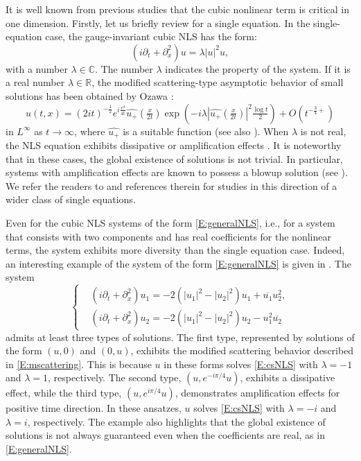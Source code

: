\documentclass[11pt,a4paper,oneside]{amsart}
\theoremstyle{plain}
\theoremstyle{remark}
\numberwithin{equation}{section}
\def\({\left(}
\def\){\right)}
\theoremstyle{definition}
\begin{document}
It is well known from previous studies that the cubic nonlinear term is critical in one dimension. Firstly, let us briefly review for a single equation. 
In the single-equation case,
the gauge-invariant cubic NLS has the form:
\begin{equation}\label{E:csNLS}
	(i  \partial_t + \partial_x^2 )u = \lambda |u|^2 u,
\end{equation}
with a number $\lambda \in \mathbb{C}$.
The number $\lambda$ indicates the property of the system.
If it is a real number $\lambda \in \mathbb{R}$, the modified scattering-type asymptotic behavior of small solutions has been obtained by Ozawa \cite{Oz}:
\begin{equation}\label{E:mscattering}
	u(t,x) = (2it)^{-\frac12} e^{i\frac{x^2}{4t}} \widehat{u_+}(\tfrac{x}{2t}) \exp \( -i \lambda |\widehat{u_+}(\tfrac{x}{2t})|^2 \tfrac{\log t}{2}  \) + O(t^{-\frac34+})
\end{equation}
in $L^\infty$  as $t\to\infty$,
where $\widehat{u_+}$ is a suitable function (see also \cite{GO,HN,KP,IT,MM,MMU,Mu}).
When $\lambda$ is not real, the NLS equation exhibits dissipative or amplification effects \cite{Shimomura,Kita}. It is noteworthy that in these cases, the global existence of solutions  is not trivial. In particular, systems with amplification effects are known to possess a blowup solution (see \cite{Kita}).
We refer the readers to \cite{MM2,MurPus} and references therein for studies in this direction of a wider class of single equations.

Even for the cubic NLS systems
of the form \eqref{E:generalNLS}, i.e., for a system that consists with two components and has real coefficients for the nonlinear terms, the system exhibits more diversity than the single equation case. Indeed, an interesting example of the system of the form \eqref{E:generalNLS} is given in
 \cite[Appendix B]{MSU2}.
The system
\begin{equation}
	\left\{
	\begin{aligned}
	& (i  \partial_t + \partial_x^2 )u_1 = -2(|u_1|^2- |u_2|^2) u_1 + \overline{u_1}u_2^2,  \\
	& (i  \partial_t + \partial_x^2 )u_2 = -2(|u_1|^2- |u_2|^2) u_2 - u_1^2\overline{u_2} 
	\end{aligned}
	\right.
\end{equation}
admits at least three types of solutions. The first type, represented by solutions of the form $(u,0)$ and $(0,u)$, exhibits the modified scattering behavior described in \eqref{E:mscattering}.
This is because $u$ in these forms solves \eqref{E:csNLS} with $\lambda=-1$ and $\lambda=1$, respectively.
The second type, $(u,e^{-i\pi/4} u)$, exhibits a dissipative effect, while the third type, $(u,e^{i\pi/4} u)$, demonstrates amplification effects for positive time direction.
In these ansatzes, $u$ solves \eqref{E:csNLS} with $\lambda=-i$ and $\lambda=i$, respectively.
The example also highlights that the global existence of solutions  is not always guaranteed 
even when the coefficients are real, as in  \eqref{E:generalNLS}.
\end{document}
